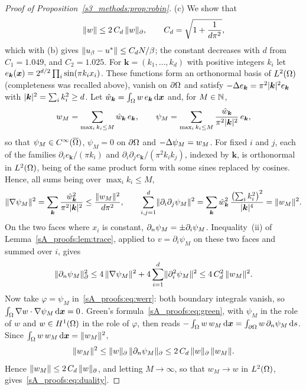 \begin{proof}[Proof of Proposition~\ref{s3_methods:prop:robin}]
(c) We show that
\begin{equation}\label{sA_proofs:eq:duality}
\lVert w\rVert\le2\,C_d\,\lVert w\rVert_{\partial},\qquad C_d=\sqrt{1+\frac{1}{d\pi^2}} ,
\end{equation}
which with (b) gives $\lVert u_{\beta}-u^{*}\rVert\le C_dN/\beta$; the constant decreases with $d$
from $C_1=1.049$, and $C_2=1.025$. For
$\boldsymbol k=(k_1,\dots,k_d)$ with positive integers $k_i$ let
$e_{\boldsymbol k}(\boldsymbol{x})=2^{d/2}\prod_i\sin(\pi k_ix_i)$. These functions form an orthonormal
basis of $L^2(\Omega)$ (completeness was recalled above), vanish on $\partial\Omega$ and satisfy
$-\Delta e_{\boldsymbol k}=\pi^2\lvert \boldsymbol k\rvert^2e_{\boldsymbol k}$ with
$\lvert \boldsymbol k\rvert^2=\sum_ik_i^2\ge d$. Let
$\hat w_{\boldsymbol k}=\int_\Omega w\,e_{\boldsymbol k}\,\mathrm{d}\boldsymbol{x}$ and, for $M\in\mathbb{N}$,
\[
w_M=\sum_{\max_ik_i\le M}\hat w_{\boldsymbol k}\,e_{\boldsymbol k},
\qquad
\psi_M=\sum_{\max_ik_i\le M}\frac{\hat w_{\boldsymbol k}}{\pi^2\lvert \boldsymbol k\rvert^2}\,e_{\boldsymbol k},
\]
so that $\psi_M\in C^\infty(\overline{\Omega})$, $\psi_M=0$ on $\partial\Omega$ and $-\Delta\psi_M=w_M$. For
fixed $i$ and $j$, each of the families $\partial_ie_{\boldsymbol k}/(\pi k_i)$ and
$\partial_i\partial_je_{\boldsymbol k}/(\pi^2k_ik_j)$, indexed by $\boldsymbol k$, is
orthonormal in $L^2(\Omega)$, being of the same product form with some sines replaced by
cosines. Hence, all sums being over $\max_ik_i\le M$,
\[
\lVert \nabla\psi_M\rVert^2=\sum_{\boldsymbol k}\frac{\hat w_{\boldsymbol k}^2}{\pi^2\lvert \boldsymbol k\rvert^2}
\le\frac{\lVert w_M\rVert^2}{d\pi^2},
\qquad
\sum_{i,j=1}^d\lVert \partial_i\partial_j\psi_M\rVert^2
=\sum_{\boldsymbol k}\hat w_{\boldsymbol k}^2\,\frac{\bigl(\sum_ik_i^2\bigr)^2}{\lvert \boldsymbol k\rvert^4}
=\lVert w_M\rVert^2 .
\]
On the two faces where $x_i$ is constant, $\partial_n\psi_M=\pm\partial_i\psi_M$.
Inequality~(ii) of Lemma~\ref{sA_proofs:lem:trace}, applied to $v=\partial_i\psi_M$ on
these two faces and summed over $i$, gives
\[
\lVert \partial_n\psi_M\rVert_{\partial}^2\le4\,\lVert \nabla\psi_M\rVert^2+4\sum_{i=1}^d\lVert \partial_i^2\psi_M\rVert^2
\le4\,C_d^2\,\lVert w_M\rVert^2 .
\]
Now take $\varphi=\psi_M$ in~\eqref{sA_proofs:eq:werr}: both boundary integrals vanish, so
$\int_\Omega\nabla w\cdot\nabla\psi_M\,\mathrm{d}\boldsymbol{x}=0$. Green's formula~\eqref{sA_proofs:eq:green},
with $\psi_M$ in the role of $w$ and $w\in H^1(\Omega)$ in the role of $\varphi$, then reads
$-\int_\Omega w\,w_M\,\mathrm{d}\boldsymbol{x}=\int_{\partial\Omega}w\,\partial_n\psi_M\,\mathrm{d} s$. Since
$\int_\Omega w\,w_M\,\mathrm{d}\boldsymbol{x}=\lVert w_M\rVert^2$,
\[
\lVert w_M\rVert^2\le\lVert w\rVert_{\partial}\,\lVert \partial_n\psi_M\rVert_{\partial}
\le2\,C_d\,\lVert w\rVert_{\partial}\,\lVert w_M\rVert .
\]
Hence $\lVert w_M\rVert\le2\,C_d\,\lVert w\rVert_{\partial}$, and letting $M\to\infty$, so that
$w_M\to w$ in $L^2(\Omega)$, gives~\eqref{sA_proofs:eq:duality}.


\end{proof}
